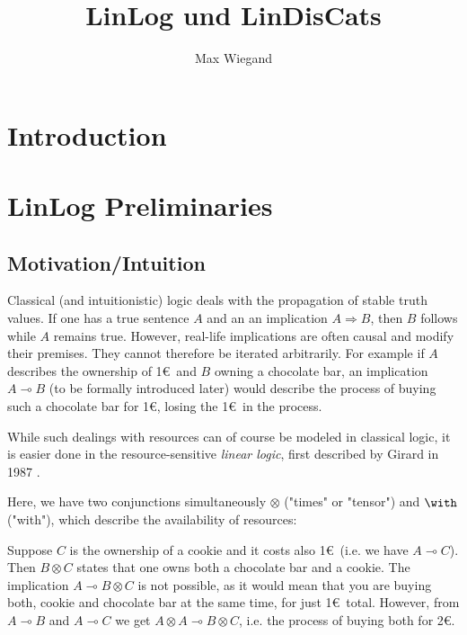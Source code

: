 \documentclass[DIN, pagenumber=false, fontsize=11pt, parskip=half, colorinlistoftodos, svgnames]{scrartcl}
\title{LinLog und LinDisCats}
\author{Max Wiegand}
\begin{document}
	\maketitle
	
	\section{Introduction}
	
	
	\section{LinLog Preliminaries}
	
	\subsection{Motivation/Intuition}
	\label{sec: intuition}
	
	
	Classical (and intuitionistic) logic deals with the propagation of stable truth values. If one has a true sentence $A$ and an an implication $A \Rightarrow B$, then $B$ follows while $A$ remains true. However, real-life implications are often causal and modify their premises. They cannot therefore be iterated arbitrarily. For example if $A$ describes the ownership of 1\euro\ and $B$ owning a chocolate bar, an implication $A \multimap B$ (to be formally introduced later) would describe the process of buying such a chocolate bar for 1\euro, losing the 1\euro\ in the process.
	
	While such dealings with resources can of course be modeled in classical logic, it is easier done in the resource-sensitive \emph{linear logic}, first described by Girard in 1987 \cite{girard87}. 
	
	Here, we have two conjunctions simultaneously $\otimes$ ("times" or "tensor") and $\with$ ("with"), which describe the availability of resources:
	
	Suppose $C$ is the ownership of a cookie and it costs also 1\euro\ (i.e. we have $A\multimap C$). Then $B \otimes C$ states that one owns both a chocolate bar and a cookie. The implication $A \multimap B \otimes C$ is not possible, as it would mean that you are buying both, cookie and chocolate bar at the same time, for just 1\euro\ total. However, from $A \multimap B$ and $A\multimap C$ we get $A \otimes A \multimap B \otimes C$, i.e. the process of buying both for 2\euro.
	
\end{document}
